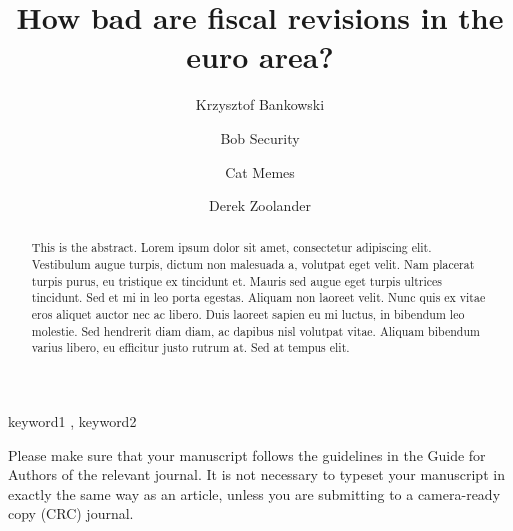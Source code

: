 \documentclass[
  authoryear,
  preprint,
  3p]{elsarticle}
\begin{document}
\begin{frontmatter}
\title{How bad are fiscal revisions in the euro area?}
\author[1]{Krzysztof Bankowski%
%
}
\author[2]{Bob Security%
%
}
\author[2]{Cat Memes%
%
}
\author[]{Derek Zoolander%
%
}



        
\begin{abstract}
This is the abstract. Lorem ipsum dolor sit amet, consectetur adipiscing
elit. Vestibulum augue turpis, dictum non malesuada a, volutpat eget
velit. Nam placerat turpis purus, eu tristique ex tincidunt et. Mauris
sed augue eget turpis ultrices tincidunt. Sed et mi in leo porta
egestas. Aliquam non laoreet velit. Nunc quis ex vitae eros aliquet
auctor nec ac libero. Duis laoreet sapien eu mi luctus, in bibendum leo
molestie. Sed hendrerit diam diam, ac dapibus nisl volutpat vitae.
Aliquam bibendum varius libero, eu efficitur justo rutrum at. Sed at
tempus elit.
\end{abstract}





\begin{keyword}
    keyword1 \sep 
    keyword2
\end{keyword}
\end{frontmatter}
    \ifdefined\Shaded\renewenvironment{Shaded}{\begin{tcolorbox}[borderline west={3pt}{0pt}{shadecolor}, breakable, boxrule=0pt, interior hidden, frame hidden, enhanced, sharp corners]}{\end{tcolorbox}}\fi

Please make sure that your manuscript follows the guidelines in the
Guide for Authors of the relevant journal. It is not necessary to
typeset your manuscript in exactly the same way as an article, unless
you are submitting to a camera-ready copy (CRC) journal.
\end{document}
